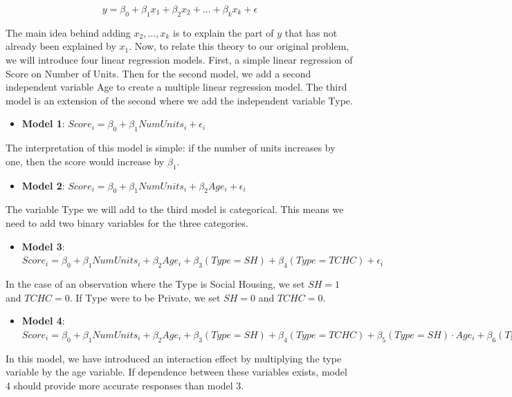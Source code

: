 \documentclass[
]{article}
\providecommand{\tightlist}{%
  \setlength{\itemsep}{0pt}\setlength{\parskip}{0pt}}
\begin{document}
\[y=\beta_0 + \beta_1x_1 + \beta_2x_2 + ... + \beta_kx_k + \epsilon\]

The main idea behind adding \(x_2,..., x_k\) is to explain the part of
\(y\) that has not already been explained by \(x_1\). Now, to relate
this theory to our original problem, we will introduce four linear
regression models. First, a simple linear regression of Score on Number
of Units. Then for the second model, we add a second independent
variable Age to create a multiple linear regression model. The third
model is an extension of the second where we add the independent
variable Type.

\begin{itemize}
\tightlist
\item
  \textbf{Model 1}:
  \(Score_i = \beta_0 + \beta_1NumUnits_i + \epsilon_i\)
\end{itemize}

The interpretation of this model is simple: if the number of units
increases by one, then the score would increase by \(\beta_1\).

\begin{itemize}
\tightlist
\item
  \textbf{Model 2}:
  \(Score_i = \beta_0 + \beta_1NumUnits_i + \beta_2Age_i + \epsilon_i\)
\end{itemize}

The variable Type we will add to the third model is categorical. This
means we need to add two binary variables for the three categories.

\begin{itemize}
\tightlist
\item
  \textbf{Model 3}:
  \(Score_i = \beta_0 + \beta_1NumUnits_i + \beta_2Age_i + \beta_3(Type = SH) + \beta_4(Type=TCHC) + \epsilon_i\)
\end{itemize}

In the case of an observation where the Type is Social Housing, we set
\(SH= 1\) and \(TCHC=0\). If Type were to be Private, we set \(SH= 0\)
and \(TCHC=0\).

\begin{itemize}
\tightlist
\item
  \textbf{Model 4}:
  \(Score_i = \beta_0 + \beta_1NumUnits_i + \beta_2Age_i + \beta_3(Type = SH) + \beta_4(Type=TCHC) + \beta_5(Type = SH)\cdot Age_i + \beta_6(Type=TCHC) \cdot Age_i +\epsilon_i\)
\end{itemize}

In this model, we have introduced an interaction effect by multiplying
the type variable by the age variable. If dependence between these
variables exists, model 4 should provide more accurate responses than
model 3.
\end{document}
